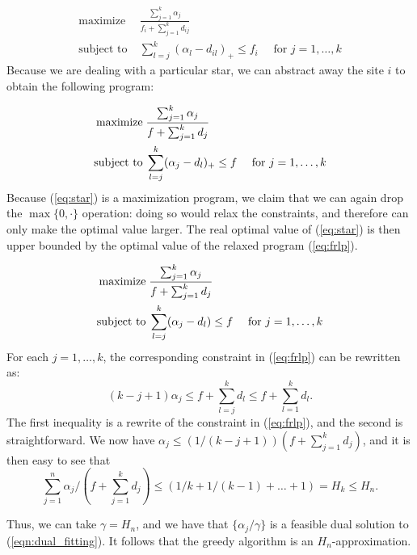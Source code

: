 \documentclass[oneside,final]{ucr}
\def\dsp{\def\baselinestretch{2.0}\large\normalsize}
\def\ssp{\def\baselinestretch{1.0}\large\normalsize}
\begin{document}
\ssp
\begin{align*}
  \textrm{maximize}\; & \frac{\sum_{j=1}^k \alpha_j}{f_i + \sum_{j=1}^k d_{ij}}\\
  \textrm{subject to}\; & \sum_{l=j}^k (\alpha_l -
  d_{il})_+\leq f_i \quad \textrm{ for } j=1,\ldots,k
\end{align*}
\dsp
Because we are dealing with a particular star, we can
abstract away the site $i$ to obtain the following program:

\ssp
\begin{align}
  \label{eq:star}
  \textrm{maximize}\; & \frac{\sum_{j=1}^k \alpha_j}{f + \sum_{j=1}^k
    d_j}\\ \notag
  \textrm{subject to}\; & \sum_{l=j}^k (\alpha_j - d_{l})_+
  \leq f \quad \textrm{ for } j=1,\ldots,k
\end{align}
\dsp
Because (\ref{eq:star}) is a maximization program, we claim
that we can again drop the $\max\{0, \cdot\}$ operation:
doing so would relax the constraints, and therefore can only
make the optimal value larger. The real optimal value of
(\ref{eq:star}) is then upper bounded by the optimal value
of the relaxed program (\ref{eq:frlp}).

\ssp
\begin{align}
  \label{eq:frlp}
  \textrm{maximize}\; & \frac{\sum_{j=1}^k \alpha_j}{f + \sum_{j=1}^k d_j}\\ \notag
  \textrm{subject to}\; & \sum_{l=j}^k (\alpha_j - d_{l})
  \leq f \quad \textrm{ for } j=1,\ldots,k
\end{align}
\dsp
For each $j=1,\ldots,k$, the corresponding constraint in
(\ref{eq:frlp}) can be rewritten as:
\begin{equation}
  (k-j+1) \alpha_j \leq f + \sum_{l=j}^k d_l \leq f +
  \sum_{l=1}^k d_l.
\end{equation}
The first inequality is a rewrite of the constraint in
(\ref{eq:frlp}), and the second is straightforward.
We now have $\alpha_j \leq (1/(k-j+1)) (f + \sum_{j=1}^k
d_j)$, and it is then easy to see that
\begin{equation}
  \sum_{j=1}^n \alpha_j / (f + \sum_{j=1}^k d_j) \leq (1/k + 1/(k-1) + \ldots + 1) =  H_k \leq H_n.
\end{equation}

Thus, we can take $\gamma=H_n$, and we have that
$\{\alpha_j/\gamma\}$ is a feasible dual solution to
(\ref{eqn:dual_fitting}). It follows that the greedy
algorithm is an $H_n$-approximation.
\end{document}

